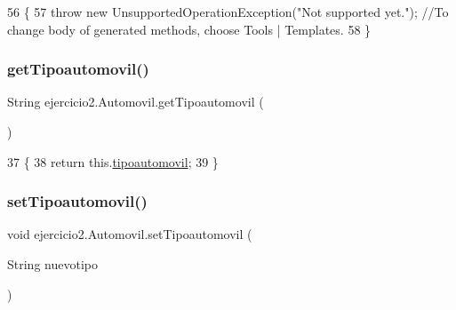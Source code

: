 \begin{DoxyCode}
56                                     \{
57         \textcolor{keywordflow}{throw} \textcolor{keyword}{new} UnsupportedOperationException(\textcolor{stringliteral}{"Not supported yet."}); \textcolor{comment}{//To change body of generated
       methods, choose Tools | Templates.}
58     \}
\end{DoxyCode}
\mbox{\label{classejercicio2_1_1_automovil_a42400460ead2eae794d19d6f280ddf94}} 
\subsubsection{\texorpdfstring{get\+Tipoautomovil()}{getTipoautomovil()}}
{\footnotesize\ttfamily String ejercicio2.\+Automovil.\+get\+Tipoautomovil (\begin{DoxyParamCaption}{ }\end{DoxyParamCaption})\hspace{0.3cm}{\ttfamily [inline]}}


\begin{DoxyCode}
37                                     \{
38         \textcolor{keywordflow}{return} this.\mbox{\hyperlink{classejercicio2_1_1_automovil_a64abc2717187d18de8f7ef8a86c4b025}{tipoautomovil}};
39     \}
\end{DoxyCode}
\mbox{\label{classejercicio2_1_1_automovil_af3240a070718139a46e75c8878f49d17}} 
\subsubsection{\texorpdfstring{set\+Tipoautomovil()}{setTipoautomovil()}}
{\footnotesize\ttfamily void ejercicio2.\+Automovil.\+set\+Tipoautomovil (\begin{DoxyParamCaption}\item[{String}]{nuevotipo }\end{DoxyParamCaption})\hspace{0.3cm}{\ttfamily [inline]}}


